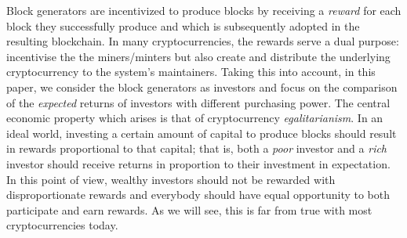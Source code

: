 Block generators are incentivized to produce blocks by receiving a
\emph{reward} for each block they successfully produce and which is
subsequently adopted in the resulting blockchain.
In many cryptocurrencies, the rewards serve a dual purpose: incentivise the
the miners/minters but also create and distribute the underlying cryptocurrency
to the system's maintainers.
Taking this into account, in this paper, we consider the block generators as investors and focus on the
comparison of the \emph{expected} returns of investors with different
purchasing power. The central economic property which arises is that of
cryptocurrency \emph{egalitarianism}. In an ideal world, investing a certain
amount of capital to produce blocks should result in rewards proportional to
that capital; that is, both a \emph{poor} investor and a \emph{rich} investor
should receive returns in proportion to their investment in expectation.
In this point of view,
wealthy investors should not be rewarded
with disproportionate rewards and everybody should have equal opportunity to both participate
and earn rewards. As we will see, this is far from true with most cryptocurrencies
today.

